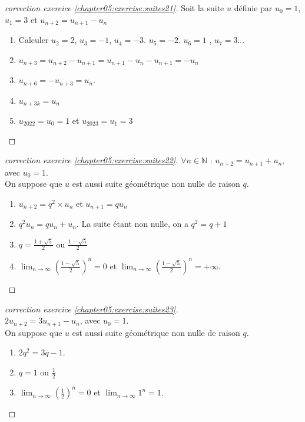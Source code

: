 \documentclass[main.tex]{subfiles}
\begin{document}
\begin{proof}[correction exercice \ref{chapter05:exercise:suites21}] 
	Soit la suite $u$ définie par $u_0=1$, $u_1=3$ et $u_{n+2}=u_{n+1}-u_n$
	\begin{enumerate}[label=\arabic*),leftmargin=*] 
		\item Calculer  \colorbox{BurntOrange}{$u_2=2$},  \colorbox{BurntOrange}{$u_3=-1$},  \colorbox{BurntOrange}{$u_4=-3$}.  \colorbox{BurntOrange}{$u_5=-2$}.  \colorbox{BurntOrange}{$u_6=1$} ,  \colorbox{BurntOrange}{$u_7=3$}...  
		\item    \colorbox{BurntOrange}{$u_{n+3}=u_{n+2}-u_{n+1}=u_{n+1}-u_{n}-u_{n+1}=-u_n$}
		\item    \colorbox{BurntOrange}{$u_{n+6}=-u_{n+3}=u_{n}$}.
		\item   \colorbox{BurntOrange}{$u_{n+3k}=u_n$} 
		\item    \colorbox{BurntOrange}{$u_{2022}=u_0=1$ et $u_{2023}=u_1=3$}
	\end{enumerate} 
\end{proof}
\begin{proof}[correction exercice \ref{chapter05:exercise:suites22}]   $\forall n\in\mathbb{N}$ : $u_{n+2}=u_{n+1}+u_n$, avec $u_0=1$.\\ On suppose  que $u$ est aussi suite géométrique non nulle de raison $q$. 
\begin{enumerate}[label=\arabic*),leftmargin=*]
	\item  \colorbox{BurntOrange}{ $u_{n+2}=q^2\times u_n$} et  \colorbox{BurntOrange}{$u_{n+1}=qu_n$} 
	\item   \colorbox{BurntOrange}{$q^2u_n=qu_n+u_n$. La suite étant non nulle, on a $q^2=q+1$}
	\item  \colorbox{BurntOrange}{$q=\frac{1+\sqrt{5}}{2}$ ou $\frac{1-\sqrt{5}}{2}$}
	\item  \colorbox{BurntOrange}{ $\lim_{n\to\infty}\left(\frac{1-\sqrt{5}}{2}\right)^n=0$ et $\lim_{n\to\infty}\left(\frac{1-\sqrt{5}}{2}\right)^n=+\infty$}.  
\end{enumerate} 
\end{proof} 
\begin{proof}[correction exercice \ref{chapter05:exercise:suites23}] \hfill  \\
	 $2u_{n+2}=3u_{n+1}-u_{n}$, avec $u_0=1$.\\
	 On suppose  que $u$ est aussi suite géométrique non nulle de raison $q$. 
\begin{enumerate}[label=\arabic*),leftmargin=*] 
	\item   \colorbox{BurntOrange}{$2q^2=3q-1$}.
	\item  \colorbox{BurntOrange}{$q=1$ ou $\frac{1}{2}$}
	\item \colorbox{BurntOrange}{ $\lim_{n\to\infty}\left(\frac{1}{2}\right)^n=0$ et $\lim_{n\to\infty}1^n=1$}.  
\end{enumerate} 
\end{proof} 
\end{document}
